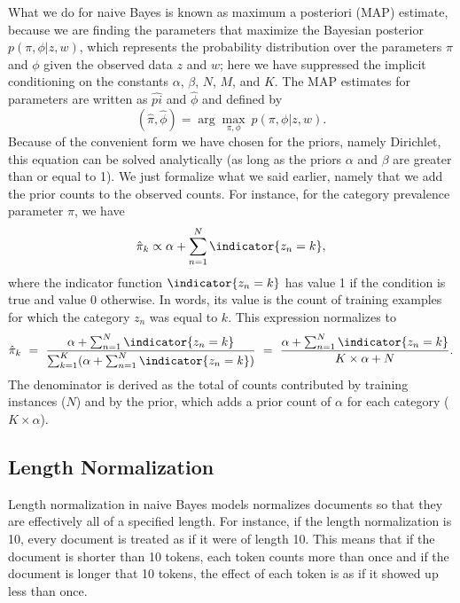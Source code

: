 What we do for naive Bayes is known as maximum a posteriori (MAP)
estimate, because we are finding the parameters that maximize the
Bayesian posterior $p(\pi,\phi|z,w)$, which represents the probability
distribution over the parameters $\pi$ and $\phi$ given the observed
data $z$ and $w$; here we have suppressed the implicit conditioning on
the constants $\alpha$, $\beta$, $N$, $M$, and $K$.  The MAP estimates
for parameters are written as $\hat{pi}$ and $\hat{\phi}$ and defined
by 
%
\begin{equation}
(\hat{\pi},\hat{\phi})
= \arg\max_{\pi,\phi} \ p(\pi,\phi|z,w).
\end{equation}  
%
Because of the convenient form we have chosen for the priors, namely
Dirichlet, this equation can be solved analytically (as long as the
priors $\alpha$ and $\beta$ are greater than or equal to 1).
We just formalize what we said earlier, namely that we add the prior
counts to the observed counts.  For instance, for the category prevalence
parameter $\pi$, we have
%
\begin{equation}
\hat{\pi}_k \propto \alpha + \sum_{n=1}^N \indicator{z_n = k},
\end{equation}
%
where the indicator function $\indicator{z_n = k}$ has value 1 if the
condition is true and value 0 otherwise.  In words, its value is the
count of training examples for which the category $z_n$ was equal to
$k$.  This expression normalizes to
%
\begin{equation}
\hat{\pi}_k 
\ = \ \frac{\alpha + \sum_{n=1}^N \indicator{z_n = k}}
       {\sum_{k=1}^K (\alpha + \sum_{n=1}^N \indicator{z_n = k})}
\ = \ \frac{\alpha + \sum_{n=1}^N \indicator{z_n = k}}
       {K \times \alpha + N}.          
\end{equation}
%
The denominator is derived as the total of counts contributed by
training instances ($N$) and by the prior, which adds a prior count of
$\alpha$ for each category ($K \times \alpha$).


\subsection{Length Normalization}

Length normalization in naive Bayes models normalizes documents so
that they are effectively all of a specified length.  For instance, if
the length normalization is 10, every document is treated as if it
were of length 10.  This means that if the document is shorter than
10 tokens, each token counts more than once and if the document is
longer that 10 tokens, the effect of each token is as if it showed
up less than once.

